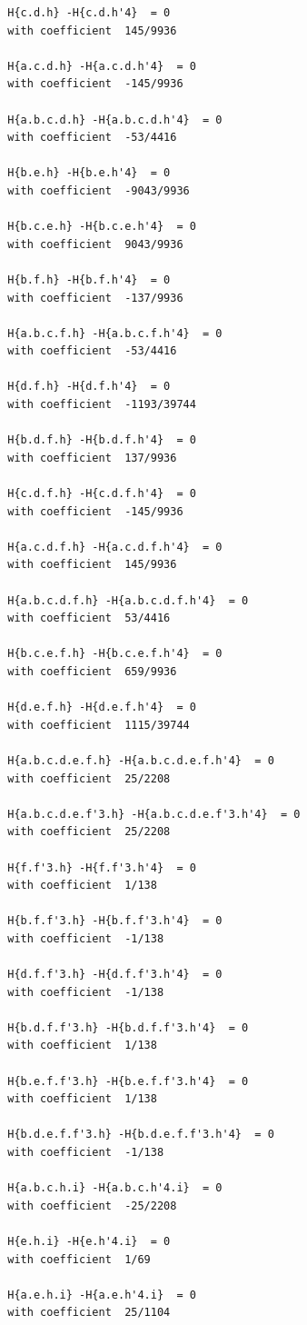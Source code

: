 \documentclass[11pt, a4paper]{kybernetika}
\begin{document}
\begin{verbatim}
		H{c.d.h} -H{c.d.h'4}  = 0
		with coefficient  145/9936
		
		H{a.c.d.h} -H{a.c.d.h'4}  = 0
		with coefficient  -145/9936
		
		H{a.b.c.d.h} -H{a.b.c.d.h'4}  = 0
		with coefficient  -53/4416
		
		H{b.e.h} -H{b.e.h'4}  = 0
		with coefficient  -9043/9936
		
		H{b.c.e.h} -H{b.c.e.h'4}  = 0
		with coefficient  9043/9936
		
		H{b.f.h} -H{b.f.h'4}  = 0
		with coefficient  -137/9936
		
		H{a.b.c.f.h} -H{a.b.c.f.h'4}  = 0
		with coefficient  -53/4416
		
		H{d.f.h} -H{d.f.h'4}  = 0
		with coefficient  -1193/39744
		
		H{b.d.f.h} -H{b.d.f.h'4}  = 0
		with coefficient  137/9936
		
		H{c.d.f.h} -H{c.d.f.h'4}  = 0
		with coefficient  -145/9936
		
		H{a.c.d.f.h} -H{a.c.d.f.h'4}  = 0
		with coefficient  145/9936
		
		H{a.b.c.d.f.h} -H{a.b.c.d.f.h'4}  = 0
		with coefficient  53/4416
		
		H{b.c.e.f.h} -H{b.c.e.f.h'4}  = 0
		with coefficient  659/9936
		
		H{d.e.f.h} -H{d.e.f.h'4}  = 0
		with coefficient  1115/39744
		
		H{a.b.c.d.e.f.h} -H{a.b.c.d.e.f.h'4}  = 0
		with coefficient  25/2208
		
		H{a.b.c.d.e.f'3.h} -H{a.b.c.d.e.f'3.h'4}  = 0
		with coefficient  25/2208
		
		H{f.f'3.h} -H{f.f'3.h'4}  = 0
		with coefficient  1/138
		
		H{b.f.f'3.h} -H{b.f.f'3.h'4}  = 0
		with coefficient  -1/138
		
		H{d.f.f'3.h} -H{d.f.f'3.h'4}  = 0
		with coefficient  -1/138
		
		H{b.d.f.f'3.h} -H{b.d.f.f'3.h'4}  = 0
		with coefficient  1/138
		
		H{b.e.f.f'3.h} -H{b.e.f.f'3.h'4}  = 0
		with coefficient  1/138
		
		H{b.d.e.f.f'3.h} -H{b.d.e.f.f'3.h'4}  = 0
		with coefficient  -1/138
		
		H{a.b.c.h.i} -H{a.b.c.h'4.i}  = 0
		with coefficient  -25/2208
		
		H{e.h.i} -H{e.h'4.i}  = 0
		with coefficient  1/69
		
		H{a.e.h.i} -H{a.e.h'4.i}  = 0
		with coefficient  25/1104
		

\end{verbatim}
\end{document}
